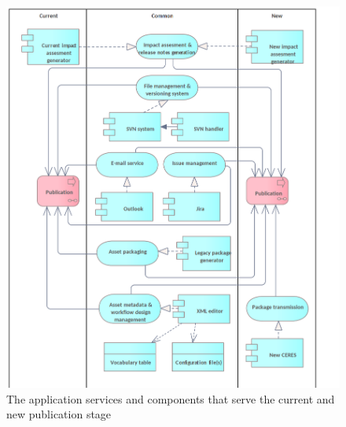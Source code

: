 	\begin{figure}[h]
		\centering
		\includegraphics[width=.9\textwidth]{images/application/Publication v3.png}
		\caption{The application services and components that serve the current and new publication stage}
		\label{fig:application-publication}
	\end{figure}

	